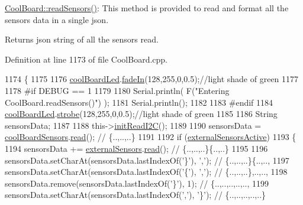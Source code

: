 \hyperlink{class_cool_board_ad03abdce2e65f520bbf2cff0f2d083cf}{Cool\+Board\+::read\+Sensors()}\+: This method is provided to read and format all the sensors data in a single json.

\begin{DoxyReturn}{Returns}
json string of all the sensors read. 
\end{DoxyReturn}


Definition at line 1173 of file Cool\+Board.\+cpp.


\begin{DoxyCode}
1174 \{
1175 
1176     \hyperlink{class_cool_board_a1b1d3c684a5baa56b08486e192fd8e97}{coolBoardLed}.\hyperlink{class_cool_board_led_ab778f5e7bed0ab74e3906d82110493c3}{fadeIn}(128,255,0,0.5);\textcolor{comment}{//light shade of green}
1177                 
1178 \textcolor{preprocessor}{#if DEBUG == 1}
1179 
1180     Serial.println( F(\textcolor{stringliteral}{"Entering CoolBoard.readSensors()"}) );
1181     Serial.println();
1182 
1183 \textcolor{preprocessor}{#endif}
1184     \hyperlink{class_cool_board_a1b1d3c684a5baa56b08486e192fd8e97}{coolBoardLed}.\hyperlink{class_cool_board_led_ad5f0de4c628cbfbf49896042831c64ad}{strobe}(128,255,0,0.5);\textcolor{comment}{//light shade of green}
1185 
1186     String sensorsData;
1187     
1188     this->\hyperlink{class_cool_board_a397b46fadab8f530a8cf4d914c561366}{initReadI2C}();
1189 
1190     sensorsData = \hyperlink{class_cool_board_af102be5288bd7f7a8e59b13f86e26a00}{coolBoardSensors}.\hyperlink{class_cool_board_sensors_a91badb2539d91fda8679f2a597874c48}{read}(); \textcolor{comment}{// \{..,..,..\}}
1191     
1192     \textcolor{keywordflow}{if} (\hyperlink{class_cool_board_a638b00b76aeb819ecfd4c10b8cdd7bb7}{externalSensorsActive})
1193     \{
1194         sensorsData += \hyperlink{class_cool_board_a09e26264839c65873eb56af476eff6b2}{externalSensors}.\hyperlink{class_external_sensors_a53177b81eca3be89508b5511ddcd00fc}{read}(); \textcolor{comment}{// \{..,..,..\}\{..,..\}}
1195 
1196         sensorsData.setCharAt(sensorsData.lastIndexOf(\textcolor{charliteral}{'\}'}), \textcolor{charliteral}{','}); \textcolor{comment}{// \{..,..,..\}\{..,..,}
1197         sensorsData.setCharAt(sensorsData.lastIndexOf(\textcolor{charliteral}{'\{'}), \textcolor{charliteral}{','}); \textcolor{comment}{// \{..,..,..\},..,..,}
1198         sensorsData.remove(sensorsData.lastIndexOf(\textcolor{charliteral}{'\}'}), 1); \textcolor{comment}{// \{..,..,..,..,..,}
1199         sensorsData.setCharAt(sensorsData.lastIndexOf(\textcolor{charliteral}{','}), \textcolor{charliteral}{'\}'}); \textcolor{comment}{// \{..,..,..,..,..\}}

\end{DoxyCode}
